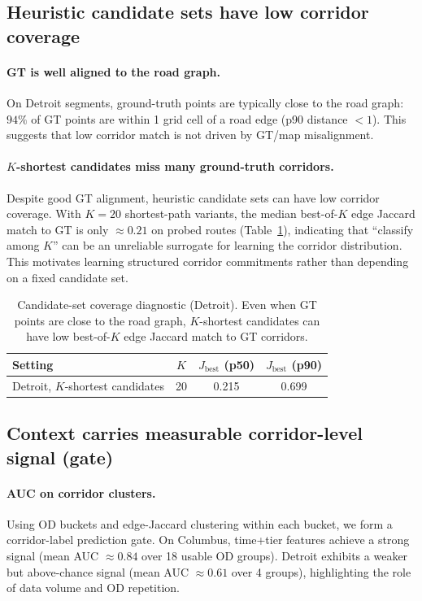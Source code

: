 \subsection{Heuristic candidate sets have low corridor coverage}
\paragraph{GT is well aligned to the road graph.}
On Detroit segments, ground-truth points are typically close to the road graph: $94\%$ of GT points are within 1 grid cell of a road edge (p90 distance $<1$).
This suggests that low corridor match is not driven by GT/map misalignment.

\paragraph{$K$-shortest candidates miss many ground-truth corridors.}
Despite good GT alignment, heuristic candidate sets can have low corridor coverage.
With $K=20$ shortest-path variants, the median best-of-$K$ edge Jaccard match to GT is only $\approx 0.21$ on probed routes (Table~\ref{tab:candidate-coverage}), indicating that ``classify among $K$'' can be an unreliable surrogate for learning the corridor distribution.
This motivates learning structured corridor commitments rather than depending on a fixed candidate set.

\begin{table}[t]
  \centering
  \small
  \begin{tabular}{lccc}
    \toprule
    Setting & $K$ & $J_{\mathrm{best}}$ (p50) & $J_{\mathrm{best}}$ (p90) \\
    \midrule
    Detroit, $K$-shortest candidates & 20 & 0.215 & 0.699 \\
    \bottomrule
  \end{tabular}
  \caption{Candidate-set coverage diagnostic (Detroit). Even when GT points are close to the road graph, $K$-shortest candidates can have low best-of-$K$ edge Jaccard match to GT corridors.}
  \label{tab:candidate-coverage}
\end{table}

\subsection{Context carries measurable corridor-level signal (gate)}
\paragraph{AUC on corridor clusters.}
Using OD buckets and edge-Jaccard clustering within each bucket, we form a corridor-label prediction gate.
On Columbus, time+tier features achieve a strong signal (mean AUC $\approx 0.84$ over 18 usable OD groups).
Detroit exhibits a weaker but above-chance signal (mean AUC $\approx 0.61$ over 4 groups), highlighting the role of data volume and OD repetition.

